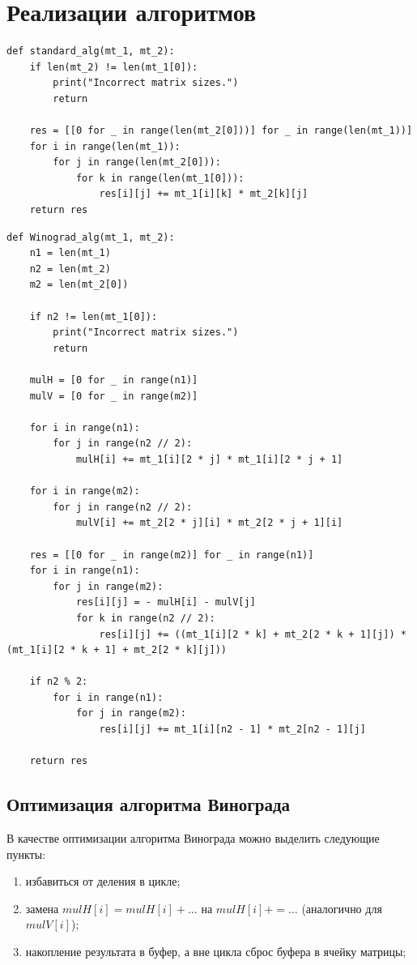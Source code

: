 \documentclass[12pt]{report}
\begin{document}
\section{Реализации алгоритмов}

\begin{lstlisting}[label=some-code,caption=Функция классического умножения матриц]
def standard_alg(mt_1, mt_2):
	if len(mt_2) != len(mt_1[0]):
		print("Incorrect matrix sizes.")
		return

	res = [[0 for _ in range(len(mt_2[0]))] for _ in range(len(mt_1))]
	for i in range(len(mt_1)):
		for j in range(len(mt_2[0])):
			for k in range(len(mt_1[0])):
				res[i][j] += mt_1[i][k] * mt_2[k][j]
	return res
\end{lstlisting}


\begin{lstlisting}[label=some-code,caption=Алгоритм Винограда]
def Winograd_alg(mt_1, mt_2):
	n1 = len(mt_1)
	n2 = len(mt_2)
	m2 = len(mt_2[0])

	if n2 != len(mt_1[0]):
		print("Incorrect matrix sizes.")
		return
	
	mulH = [0 for _ in range(n1)]
	mulV = [0 for _ in range(m2)]
	
	for i in range(n1):
		for j in range(n2 // 2):
			mulH[i] += mt_1[i][2 * j] * mt_1[i][2 * j + 1]
	
	for i in range(m2):
		for j in range(n2 // 2):
			mulV[i] += mt_2[2 * j][i] * mt_2[2 * j + 1][i]
	
	res = [[0 for _ in range(m2)] for _ in range(n1)]
	for i in range(n1):
		for j in range(m2):
			res[i][j] = - mulH[i] - mulV[j]
			for k in range(n2 // 2):
				res[i][j] += ((mt_1[i][2 * k] + mt_2[2 * k + 1][j]) * (mt_1[i][2 * k + 1] + mt_2[2 * k][j]))
	
	if n2 % 2:
		for i in range(n1):
			for j in range(m2):
				res[i][j] += mt_1[i][n2 - 1] * mt_2[n2 - 1][j]
	
	return res
\end{lstlisting}

\subsection{Оптимизация алгоритма Винограда}
В качестве оптимизации алгоритма Винограда можно выделить следующие пункты:
\begin{enumerate}
	\item избавиться от деления в цикле;
	\item замена $mulH[i] = mulH[i] + …$ на $mulH[i] += …$ (аналогично для $mulV[i]$);
	\item накопление результата в буфер, а вне цикла сброс буфера в ячейку матрицы;
\end{enumerate}
\end{document}
